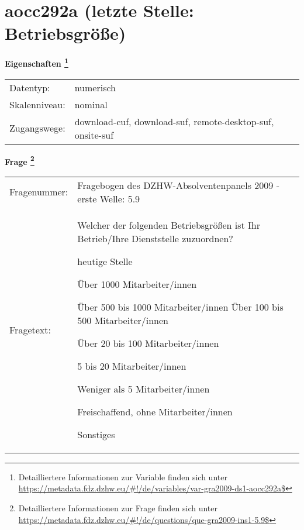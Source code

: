 
    \setcounter{footnote}{0}

    \vspace*{-1.8cm}
	\section{aocc292a (letzte Stelle: Betriebsgröße)}
	\label{section:aocc292a}



    \vspace*{0.5cm}
    \noindent\textbf{Eigenschaften
	\footnote{Detailliertere Informationen zur Variable finden sich unter
		\url{https://metadata.fdz.dzhw.eu/\#!/de/variables/var-gra2009-ds1-aocc292a$}}}\\
	\begin{tabularx}{\hsize}{@{}lX}
	Datentyp: & numerisch \\
	Skalenniveau: & nominal \\
	Zugangswege: &
	  download-cuf, 
	  download-suf, 
	  remote-desktop-suf, 
	  onsite-suf
 \\
    \end{tabularx}



				\vspace*{0.5cm}
                \noindent\textbf{Frage
	                \footnote{Detailliertere Informationen zur Frage finden sich unter
		              \url{https://metadata.fdz.dzhw.eu/\#!/de/questions/que-gra2009-ins1-5.9$}}}\\
				\begin{tabularx}{\hsize}{@{}lX}
					Fragenummer: &
					  Fragebogen des DZHW-Absolventenpanels 2009 - erste Welle:
					  5.9
 \\
					Fragetext: & Welcher der folgenden Betriebsgrößen ist Ihr Betrieb/Ihre Dienststelle zuzuordnen?\par  heutige Stelle\par  Über 1000 Mitarbeiter/innen\par  Über 500 bis 1000 Mitarbeiter/innen Über 100 bis 500 Mitarbeiter/innen\par  Über 20 bis 100 Mitarbeiter/innen\par  5 bis 20 Mitarbeiter/innen\par  Weniger als 5 Mitarbeiter/innen\par  Freischaffend, ohne Mitarbeiter/innen\par  Sonstiges \\
				\end{tabularx}





